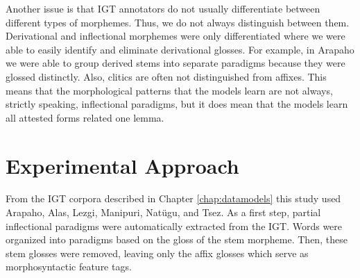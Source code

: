 Another issue is that IGT annotators do not usually differentiate between different types of morphemes. Thus, we do not always distinguish between them. Derivational and inflectional morphemes were only differentiated where we were able to easily identify and eliminate derivational glosses. For example, in Arapaho we were able to group derived stems into separate paradigms because they were glossed distinctly. Also, clitics are often not distinguished from affixes. This means that the morphological patterns that the models learn are not always, strictly speaking, inflectional paradigms, but it does mean that the models learn all attested forms related one lemma.


\section{Experimental Approach}

From the IGT corpora described in Chapter \ref{chap:datamodels} this study used Arapaho, Alas, Lezgi, Manipuri, Nat\"ugu, and Tsez.
As a first step, partial inflectional paradigms were automatically extracted from the IGT. Words were organized into paradigms based on the gloss of the stem morpheme. Then, these stem glosses were removed, leaving only the affix glosses which serve as morphosyntactic feature tags. 

